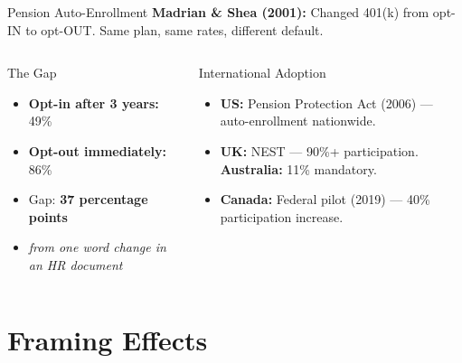 \documentclass[aspectratio=169]{beamer}
\begin{document}
\begin{frame}{Pension Auto-Enrollment}
\textcolor{beblue}{\textbf{Madrian \& Shea (2001):}} Changed 401(k) from opt-IN to opt-OUT. Same plan, same rates, different default.
\begin{columns}
\begin{block}{The Gap}
\begin{itemize}\setlength{\itemsep}{0pt}
  \item \textbf{Opt-in after 3 years:} 49\%
  \item \textbf{Opt-out immediately:} 86\%
  \item Gap: \textbf{37 percentage points}
  \item \textit{from one word change in an HR document}
\end{itemize}
\end{block}
\begin{exampleblock}{International Adoption}
\begin{itemize}\small\setlength{\itemsep}{0pt}
  \item \textbf{US:} Pension Protection Act (2006) --- auto-enrollment nationwide.
  \item \textbf{UK:} NEST --- 90\%+ participation. \textbf{Australia:} 11\% mandatory.
  \item \textbf{Canada:} Federal pilot (2019) --- 40\% participation increase.
\end{itemize}
\end{exampleblock}
\end{columns}
\end{frame}

\section{Framing Effects}
\end{document}
